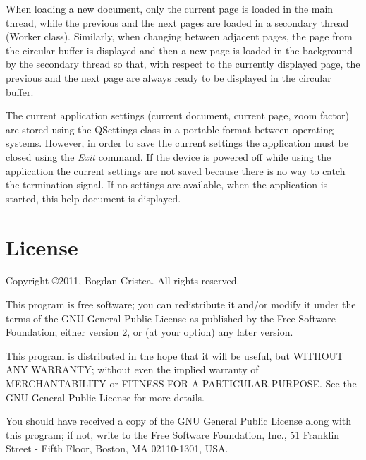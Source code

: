 \documentclass[journal,12pt]{IEEEtran}
\begin{document}
When loading a new document, only the current page is loaded in the main thread, while the previous and the next pages are loaded in a secondary thread (\textrm{Worker} class). Similarly, when changing between adjacent pages, the page from the circular buffer is displayed and then a new page is loaded in the background by the secondary thread so that, with respect to the currently displayed page, the previous and the next page are always ready to be displayed in the circular buffer.

The current application settings (current document, current page, zoom factor) are stored using the \textrm{QSettings} class in a portable format between operating systems. However, in order to save the current settings the application must be closed using the \textit{Exit} command. If the device is powered off while using the application the current settings are not saved because there is no way to catch the termination signal. If no settings are available, when the application is started, this help document is displayed.

\section{License}
 Copyright \copyright 2011, Bogdan Cristea. All rights reserved.
 
 This program is free software; you can redistribute it and/or modify  it under the terms of the GNU General Public License as published by  the Free Software Foundation; either version 2, or (at your option)  any later version.
 
 This program is distributed in the hope that it will be useful,  but WITHOUT ANY WARRANTY; without even the implied warranty of
 MERCHANTABILITY or FITNESS FOR A PARTICULAR PURPOSE.  See the  GNU General Public License for more details.
 
 You should have received a copy of the GNU General Public License along with this program; if not, write to the Free Software
 Foundation, Inc., 51 Franklin Street - Fifth Floor, Boston, MA 02110-1301, USA.
\end{document}
